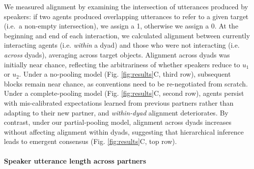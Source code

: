 We measured alignment by examining the intersection of utterances produced by speakers: if two agents produced overlapping utterances to refer to a given target (i.e.~a non-empty intersection), we assign a 1, otherwise we assign a 0.
At the beginning and end of each interaction, we calculated alignment between currently interacting agents (i.e. \emph{within} a dyad) and those who were not interacting (i.e. \emph{across} dyads), averaging across target objects.
Alignment across dyads was initially near chance, reflecting the arbitrariness of whether speakers reduce to $u_1$ or $u_2$. 
Under a no-pooling model (Fig. \ref{fig:results}C, third row), subsequent blocks remain near chance, as conventions need to be re-negotiated from scratch.
Under a complete-pooling model (Fig. \ref{fig:results}C, second row), agents persist with mis-calibrated expectations learned from previous partners rather than adapting to their new partner, and \emph{within-dyad} alignment deteriorates.
By contrast, under our partial-pooling model, alignment across dyads increases without affecting alignment within dyads, suggesting that hierarchical inference leads to emergent consensus (Fig. \ref{fig:results}C, top row).


%
%
\paragraph{Speaker utterance length across partners}

